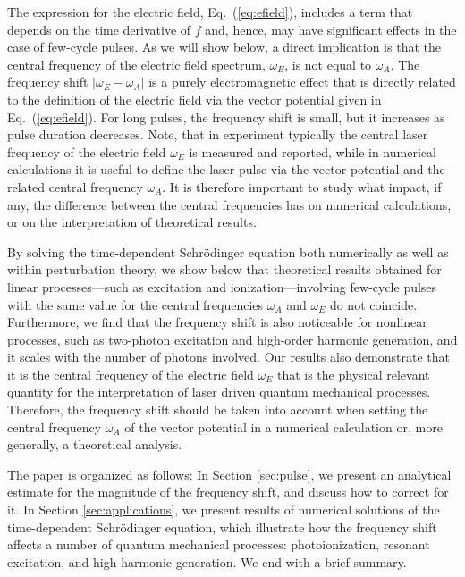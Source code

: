 The expression for the electric field, Eq.~(\ref{eq:efield}), includes a term that depends on the time derivative of $f$ and, hence, may have significant effects in the case of few-cycle pulses. As we will show below, a direct implication is that the central frequency of the electric field spectrum, $\omega_E$, is not equal to $\omega_A$. The frequency shift $|\omega_E - \omega_A|$ is a purely electromagnetic effect that is directly related to the definition of the electric field via the vector potential given in Eq.\ (\ref{eq:efield}). For long pulses, the frequency shift is small, but it increases as pulse duration decreases. Note, that in experiment typically the central laser frequency of the electric field $\omega_E$ is measured and reported, while in numerical calculations it is useful to define the laser pulse via the vector potential and the related central frequency $\omega_A$. It is therefore important to study what impact, if any, the difference between the central frequencies has on numerical calculations, or on the interpretation of theoretical results. 

By solving the time-dependent Schr\"odinger equation both numerically as well as within perturbation theory,
we show below that theoretical results obtained for linear processes---such as excitation and ionization---involving few-cycle pulses with the same value for the central frequencies $\omega_A$ and $\omega_E$ do not coincide. Furthermore, we find that the frequency shift is also noticeable for nonlinear processes, such as two-photon excitation and high-order harmonic generation, and it scales with the number of photons involved. Our results also demonstrate that it is the central frequency of the electric field $\omega_E$ that is the physical relevant quantity for the interpretation of laser driven quantum mechanical processes. Therefore, the frequency shift should be taken into account when setting the central frequency $\omega_A$ of the vector potential in a numerical calculation or, more generally, a theoretical analysis.

The paper is organized as follows: In Section \ref{sec:pulse}, we present an analytical estimate for the magnitude of the frequency shift, and discuss how to correct for it.
In Section \ref{sec:applications}, we present results of numerical solutions of the time-dependent Schrödinger equation, which illustrate how the frequency shift affects a number of quantum mechanical processes: photoionization, resonant excitation, and high-harmonic generation. We end with a brief summary.


